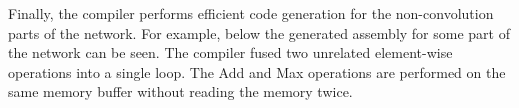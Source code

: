 Finally, the compiler performs efficient code generation for the non-\/convolution parts of the network. For example, below the generated assembly for some part of the network can be seen. The compiler fused two unrelated element-\/wise operations into a single loop. The Add and Max operations are performed on the same memory buffer without reading the memory twice.


 